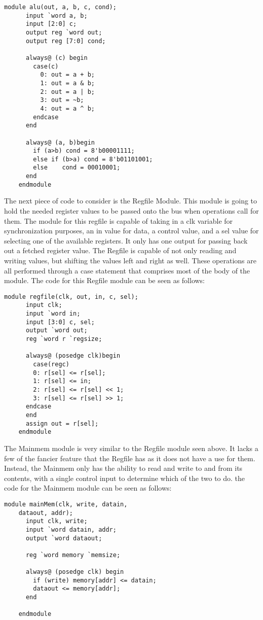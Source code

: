 \documentclass[journal]{IEEEtran}
\begin{document}
	\begin{Verbatim}[fontsize=\small]
	module alu(out, a, b, c, cond);
	  input `word a, b;
	  input [2:0] c;
	  output reg `word out;
	  output reg [7:0] cond;
	
	  always@ (c) begin
	    case(c)
		  0: out = a + b;
		  1: out = a & b;
		  2: out = a | b;
		  3: out = ~b;
		  4: out = a ^ b;
	    endcase
	  end
	
	  always@ (a, b)begin
	    if (a>b) cond = 8'b00001111;
	    else if (b>a) cond = 8'b01101001;
	    else	cond = 00010001;
	  end
	endmodule
	\end{Verbatim}
	
	The next piece of code to consider is the Regfile Module. This module is going to hold the needed register values to be passed onto the bus when operations call for them. The module for this regfile is capable of taking in a clk variable for synchronization purposes, an in value for data, a control value, and a sel value for selecting one of the available registers. It only has one output for passing back out a fetched register value. The Regfile is capable of not only reading and writing values, but shifting the values left and right as well. These operations are all performed through a case statement that comprises most of the body of the module. The code for this Regfile module can be seen as follows:
	
	\begin{Verbatim}[fontsize=\small]
	module regfile(clk, out, in, c, sel);
	  input clk;
	  input `word in;
	  input [3:0] c, sel; 
	  output `word out; 
	  reg `word r `regsize;
	
	  always@ (posedge clk)begin
		case(regc)
		0: r[sel] <= r[sel];
		1: r[sel] <= in;
		2: r[sel] <= r[sel] << 1;
		3: r[sel] <= r[sel] >> 1;
	  endcase
	  end
	  assign out = r[sel];
	endmodule
	\end{Verbatim}
	
	The Mainmem module is very similar to the Regfile module seen above. It lacks a few of the fancier feature that the Regfile has as it does not have a use for them. Instead, the Mainmem only has the ability to read and write to and from its contents, with a single control input to determine which of the two to do. the code for the Mainmem module can be seen as follows:
	
	\begin{Verbatim}[fontsize=\small]
	module mainMem(clk, write, datain,
	dataout, addr);
	  input clk, write;
	  input `word datain, addr;
	  output `word dataout;
	
	  reg `word memory `memsize;
	
	  always@ (posedge clk) begin
		if (write) memory[addr] <= datain;
		dataout <= memory[addr];
	  end
	
    endmodule
	\end{Verbatim}
	
\end{document}

